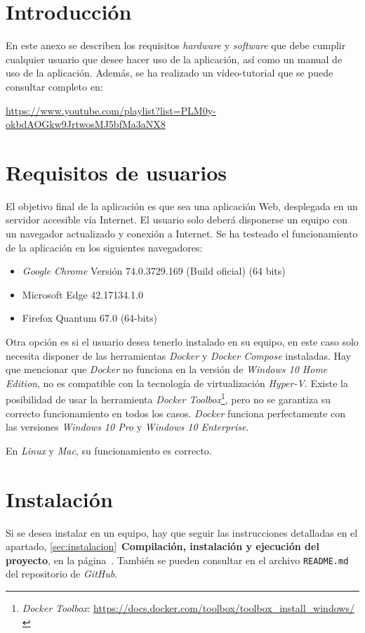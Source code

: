 
\section{Introducción}
En este anexo se describen los requisitos \emph{hardware} y \emph{software} que debe cumplir cualquier usuario que desee hacer uso de la aplicación, así como un manual de uso de la aplicación. Además, se ha realizado un vídeo-tutorial que se puede consultar completo en:

\url{https://www.youtube.com/playlist?list=PLM0y-okbdAOGkw9JrtwosMJ5bfMa3aNX8}

\section{Requisitos de usuarios}
El objetivo final de la aplicación es que sea una aplicación Web, desplegada en un servidor accesible vía Internet. El usuario solo deberá disponerse un equipo con un navegador actualizado y conexión a Internet.
Se ha testeado el funcionamiento de la aplicación en los siguientes navegadores:
\begin{itemize}
\item \emph{Google Chrome} Versión 74.0.3729.169 (Build oficial) (64 bits)
\item Microsoft Edge 42.17134.1.0
\item Firefox Quantum 67.0 (64-bits)

\end{itemize}

Otra opción es si el usuario desea tenerlo instalado en su equipo, en este caso solo necesita disponer de las herramientas \emph{Docker} y \emph{Docker Compose} instaladas. Hay que mencionar que \emph{Docker} no funciona en la versión de \emph{Windows 10 Home Edition}, no es compatible con la tecnología de virtualización  \emph{Hyper-V}. Existe la posibilidad de usar la herramienta \emph{Docker Toolbox}\footnote{\textsl{Docker Toolbox}: \url{https://docs.docker.com/toolbox/toolbox_install_windows/}}, pero no se garantiza su correcto funcionamiento en todos los casos. \emph{Docker} funciona perfectamente con las versiones \emph{Windows 10 Pro} y \emph{Windows 10 Enterprise}.

En \emph{Linux} y \emph{Mac}, su funcionamiento es correcto.

\section{Instalación}
Si se desea instalar en un equipo, hay que seguir las instrucciones detalladas en el apartado, \ref{sec:instalacion}~\textbf{Compilación, instalación y ejecución del proyecto}, en la página~\pageref{sec:instalacion}. También se pueden consultar en el archivo  \texttt{README.md} del repositorio de \emph{GitHub}.

